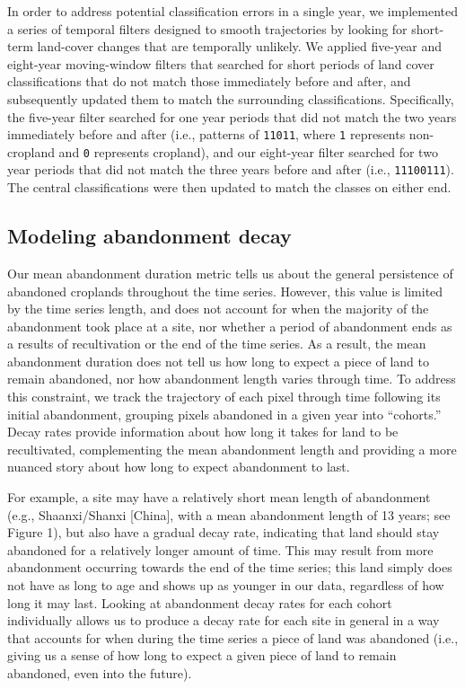 \documentclass[9pt,twocolumn,twoside,lineno]{pnas-new}
\begin{document}
In order to address potential classification errors in a single year, we implemented a series of temporal filters designed to smooth trajectories by looking for short-term land-cover changes that are temporally unlikely.
We applied five-year and eight-year moving-window filters that searched for short periods of land cover classifications that do not match those immediately before and after, and subsequently updated them to match the surrounding classifications.
Specifically, the five-year filter searched for one year periods that did not match the two years immediately before and after (i.e., patterns of \texttt{11011}, where \texttt{1} represents non-cropland and \texttt{0} represents cropland), and our eight-year filter searched for two year periods that did not match the three years before and after (i.e., \texttt{11100111}).
The central classifications were then updated to match the classes on either end.

\hypertarget{decay-models-si}{%
\subsection{Modeling abandonment decay}\label{decay-models-si}}

Our mean abandonment duration metric tells us about the general persistence of abandoned croplands throughout the time series.
However, this value is limited by the time series length, and does not account for when the majority of the abandonment took place at a site, nor whether a period of abandonment ends as a results of recultivation or the end of the time series.
As a result, the mean abandonment duration does not tell us how long to expect a piece of land to remain abandoned, nor how abandonment length varies through time.
To address this constraint, we track the trajectory of each pixel through time following its initial abandonment, grouping pixels abandoned in a given year into ``cohorts.'' Decay rates provide information about how long it takes for land to be recultivated, complementing the mean abandonment length and providing a more nuanced story about how long to expect abandonment to last.

For example, a site may have a relatively short mean length of abandonment (e.g., Shaanxi/Shanxi {[}China{]}, with a mean abandonment length of 13 years; see Figure 1), but also have a gradual decay rate, indicating that land should stay abandoned for a relatively longer amount of time.
This may result from more abandonment occurring towards the end of the time series; this land simply does not have as long to age and shows up as younger in our data, regardless of how long it may last.
Looking at abandonment decay rates for each cohort individually allows us to produce a decay rate for each site in general in a way that accounts for when during the time series a piece of land was abandoned (i.e., giving us a sense of how long to expect a given piece of land to remain abandoned, even into the future).
\end{document}
